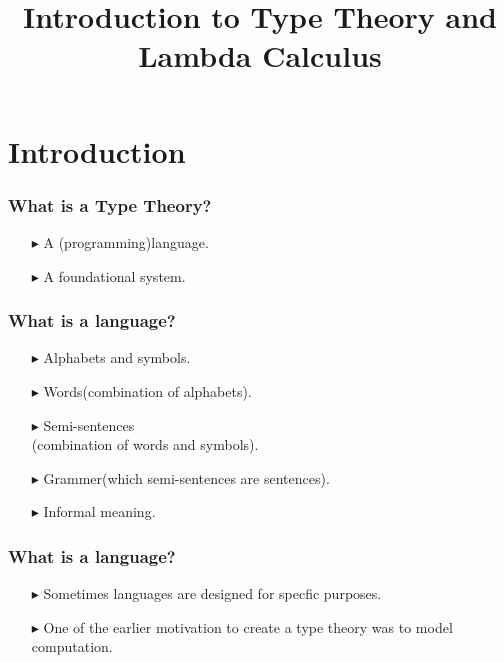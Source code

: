 \documentclass[14pt,compress]{beamer}
\title{Introduction to Type Theory and Lambda Calculus}
\date{}
\begin{document}

\begin{frame}\label{frame : titlepage}
\titlepage
\end{frame}

\section{Introduction}
\begin{frame}\label{frame : what is a type theory}
\frametitle{What is a Type Theory?}

\begin{enumerate}
\pause
\item[$\blacktriangleright$] A (programming)language.
\pause
\item[$\blacktriangleright$] A foundational system.
\end{enumerate}

\end{frame}


\begin{frame}\label{frame : what is a language}
\frametitle{What is a language?}

\begin{enumerate}
\pause
\item[$\blacktriangleright$] Alphabets and symbols.
\pause
\item[$\blacktriangleright$] Words(combination of alphabets).
\pause
\item[$\blacktriangleright$] Semi-sentences\\(combination of words and symbols).
\pause
\item[$\blacktriangleright$] Grammer(which semi-sentences are sentences).
\pause
\item[$\blacktriangleright$] Informal meaning.
\end{enumerate}

\end{frame}


\begin{frame}\label{frame : purpose of a language}
\frametitle{What is a language?}

\begin{enumerate}
\item[$\blacktriangleright$] Sometimes languages are designed for specfic purposes.
\pause
\item[$\blacktriangleright$] One of the earlier motivation to create a type theory was to
model computation. 
\end{enumerate}

\end{frame}
\end{document}

